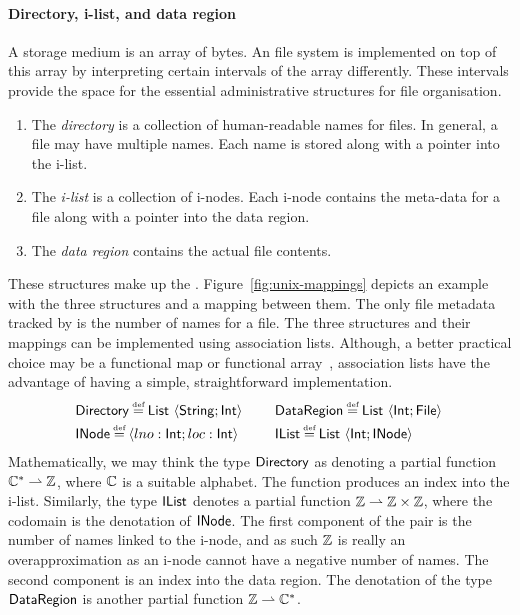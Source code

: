 \documentclass[12pt,phd,lfcs,twoside,openright,logo,leftchapter,normalheadings]{infthesis}
\theoremstyle{plain}
\theoremstyle{definition}
\begin{document}
\paragraph{Directory, i-list, and data region}
%
A storage medium is an array of bytes. An \UNIX{} file system is
implemented on top of this array by interpreting certain intervals of
the array differently. These intervals provide the space for the
essential administrative structures for file organisation.
%
\begin{enumerate}
  \item The \emph{directory} is a collection of human-readable names for
  files. In general, a file may have multiple names. Each name is
  stored along with a pointer into the i-list.
  \item The \emph{i-list} is a collection of i-nodes. Each i-node
  contains the meta-data for a file along with a pointer into the data
  region.
  \item The \emph{data region} contains the actual file contents.
\end{enumerate}
%
These structures make up the \fsname{}.
%
Figure~\ref{fig:unix-mappings} depicts an example with the three
structures and a mapping between them.
%
The only file metadata tracked by \fsname{} is the number of names for
a file.
%
The three structures and their mappings can be implemented using
association lists. Although, a better practical choice may be a
functional map or functional array~\cite{Okasaki99}, association lists
have the advantage of having a simple, straightforward implementation.
%
\[
  \ba{@{~}l@{\qquad}c@{~}l}
    \Directory \defas \List~\Record{\String;\Int} &&%
    \DataRegion \defas \List~\Record{\Int;\UFile} \smallskip\\
    \INode \defas \Record{lno:\Int;loc:\Int}  &&%
    \IList \defas \List~\Record{\Int;\INode}
  \ea
\]
%
Mathematically, we may think the type $\mathsf{Directory}$ as denoting a
partial function $\mathbb{C}^\ast \rightharpoonup \mathbb{Z}$, where $\mathbb{C}$ is a suitable
alphabet. The function produces an index into the i-list.
%
Similarly, the type $\mathsf{IList}$ denotes a partial function
$\mathbb{Z} \rightharpoonup \mathbb{Z} \times \mathbb{Z}$, where the codomain is the denotation of
$\mathsf{INode}$. The first component of the pair is the number of names
linked to the i-node, and as such $\mathbb{Z}$ is really an overapproximation
as an i-node cannot have a negative number of names. The second
component is an index into the data region.
%
The denotation of the type $\mathsf{DataRegion}$ is another partial
function $\mathbb{Z} \rightharpoonup \mathbb{C}^\ast$.
\end{document}
